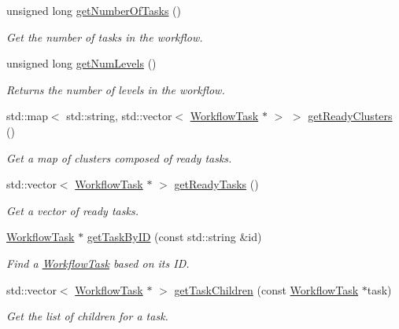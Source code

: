 \begin{DoxyCompactItemize}
unsigned long \hyperlink{classwrench_1_1_workflow_ab2b98a21d67824c2fc17cdc71c7e3909}{get\+Number\+Of\+Tasks} ()
\begin{DoxyCompactList}\small\item\em Get the number of tasks in the workflow. \end{DoxyCompactList}\item 
unsigned long \hyperlink{classwrench_1_1_workflow_a15f12b7d5088e8e1e2130545c2b795ea}{get\+Num\+Levels} ()
\begin{DoxyCompactList}\small\item\em Returns the number of levels in the workflow. \end{DoxyCompactList}\item 
std\+::map$<$ std\+::string, std\+::vector$<$ \hyperlink{classwrench_1_1_workflow_task}{Workflow\+Task} $\ast$ $>$ $>$ \hyperlink{classwrench_1_1_workflow_a875d3d3a26eba6316e249169814b853f}{get\+Ready\+Clusters} ()
\begin{DoxyCompactList}\small\item\em Get a map of clusters composed of ready tasks. \end{DoxyCompactList}\item 
std\+::vector$<$ \hyperlink{classwrench_1_1_workflow_task}{Workflow\+Task} $\ast$ $>$ \hyperlink{classwrench_1_1_workflow_a4834ec73e7a707338bad20d1da8a69ed}{get\+Ready\+Tasks} ()
\begin{DoxyCompactList}\small\item\em Get a vector of ready tasks. \end{DoxyCompactList}\item 
\hyperlink{classwrench_1_1_workflow_task}{Workflow\+Task} $\ast$ \hyperlink{classwrench_1_1_workflow_a43d89af79196164d060115ee25200306}{get\+Task\+By\+ID} (const std\+::string \&id)
\begin{DoxyCompactList}\small\item\em Find a \hyperlink{classwrench_1_1_workflow_task}{Workflow\+Task} based on its ID. \end{DoxyCompactList}\item 
std\+::vector$<$ \hyperlink{classwrench_1_1_workflow_task}{Workflow\+Task} $\ast$ $>$ \hyperlink{classwrench_1_1_workflow_a41bac6171a8698b355ffc90f0746d2fd}{get\+Task\+Children} (const \hyperlink{classwrench_1_1_workflow_task}{Workflow\+Task} $\ast$task)
\begin{DoxyCompactList}\small\item\em Get the list of children for a task. \end{DoxyCompactList}\item 

\end{DoxyCompactItemize}
